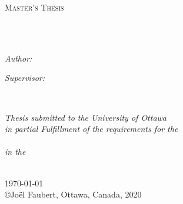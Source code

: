 \documentclass[
11pt, %
english, %
singlespacing, %
headsepline, %
]{MastersDoctoralThesis} %
\author{Jo\"el \textsc{Faubert}} %
\theoremstyle{definition}
\begin{document}
\frontmatter %

\pagestyle{plain} %


\begin{titlepage}
\begin{center}

\vspace*{.06\textheight}
{\scshape\LARGE \univname\par}\vspace{1.5cm} %
\textsc{\Large Master's Thesis}\\[0.5cm] %

\HRule \\[0.4cm] %
{\huge \bfseries \ttitle\par}\vspace{0.4cm} %
\HRule \\[1.5cm] %

\begin{minipage}[t]{0.4\textwidth}
\begin{flushleft} \large
\emph{Author:}\\
\authorname %
\end{flushleft}
\end{minipage}
\begin{minipage}[t]{0.4\textwidth}
\begin{flushright} \large
\emph{Supervisor:} \\
\supname %
\end{flushright}
\end{minipage}\\[3cm]

\vfill

\large \textit{Thesis submitted to the University of Ottawa \\
in partial Fulfillment of the requirements for the \\
 \degreename}\\[0.3cm] %
\textit{in the}\\[0.4cm]
\deptname\\[2cm] %

\vfill

{\large \today}\\[4cm] %

\vfill
\copyright Jo\"el Faubert, Ottawa, Canada, 2020
\end{center}
\end{titlepage}
\end{document}
